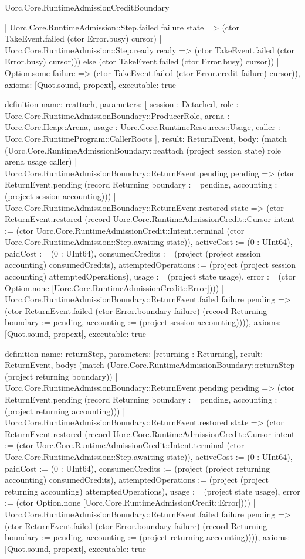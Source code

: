 \begin{lexlean}{Uorc.Core.RuntimeAdmissionCreditBoundary}
\begin{semanticmodule}
{        | Uorc.Core.RuntimeAdmission::Step.failed failure state => (ctor TakeEvent.failed (ctor Error.busy) cursor)
        | Uorc.Core.RuntimeAdmission::Step.ready ready => (ctor TakeEvent.failed (ctor Error.busy) cursor))) else (ctor TakeEvent.failed (ctor Error.busy) cursor))
    | Option.some failure => (ctor TakeEvent.failed (ctor Error.credit failure) cursor)),
  axioms: [Quot.sound, propext],
  executable: true
}

definition{
  name: reattach,
  parameters: [
    session : Detached,
    role : Uorc.Core.RuntimeAdmissionBoundary::ProducerRole,
    arena : Uorc.Core.Heap::Arena,
    usage : Uorc.Core.RuntimeResources::Usage,
    caller : Uorc.Core.RuntimeProgram::CallerRoots
  ],
  result: ReturnEvent,
  body: (match (Uorc.Core.RuntimeAdmissionBoundary::reattach (project session state) role arena usage caller)
    | Uorc.Core.RuntimeAdmissionBoundary::ReturnEvent.pending pending => (ctor ReturnEvent.pending (record Returning {boundary := pending, accounting := (project session accounting)}))
    | Uorc.Core.RuntimeAdmissionBoundary::ReturnEvent.restored state => (ctor ReturnEvent.restored (record Uorc.Core.RuntimeAdmissionCredit::Cursor {intent := (ctor Uorc.Core.RuntimeAdmissionCredit::Intent.terminal (ctor Uorc.Core.RuntimeAdmission::Step.awaiting state)), activeCost := (0 : UInt64), paidCost := (0 : UInt64), consumedCredits := (project (project session accounting) consumedCredits), attemptedOperations := (project (project session accounting) attemptedOperations), usage := (project state usage), error := (ctor Option.none [Uorc.Core.RuntimeAdmissionCredit::Error])}))
    | Uorc.Core.RuntimeAdmissionBoundary::ReturnEvent.failed failure pending => (ctor ReturnEvent.failed (ctor Error.boundary failure) (record Returning {boundary := pending, accounting := (project session accounting)}))),
  axioms: [Quot.sound, propext],
  executable: true
}

definition{
  name: returnStep,
  parameters: [returning : Returning],
  result: ReturnEvent,
  body: (match (Uorc.Core.RuntimeAdmissionBoundary::returnStep (project returning boundary))
    | Uorc.Core.RuntimeAdmissionBoundary::ReturnEvent.pending pending => (ctor ReturnEvent.pending (record Returning {boundary := pending, accounting := (project returning accounting)}))
    | Uorc.Core.RuntimeAdmissionBoundary::ReturnEvent.restored state => (ctor ReturnEvent.restored (record Uorc.Core.RuntimeAdmissionCredit::Cursor {intent := (ctor Uorc.Core.RuntimeAdmissionCredit::Intent.terminal (ctor Uorc.Core.RuntimeAdmission::Step.awaiting state)), activeCost := (0 : UInt64), paidCost := (0 : UInt64), consumedCredits := (project (project returning accounting) consumedCredits), attemptedOperations := (project (project returning accounting) attemptedOperations), usage := (project state usage), error := (ctor Option.none [Uorc.Core.RuntimeAdmissionCredit::Error])}))
    | Uorc.Core.RuntimeAdmissionBoundary::ReturnEvent.failed failure pending => (ctor ReturnEvent.failed (ctor Error.boundary failure) (record Returning {boundary := pending, accounting := (project returning accounting)}))),
  axioms: [Quot.sound, propext],
  executable: true
}


\end{semanticmodule}
\end{lexlean}
